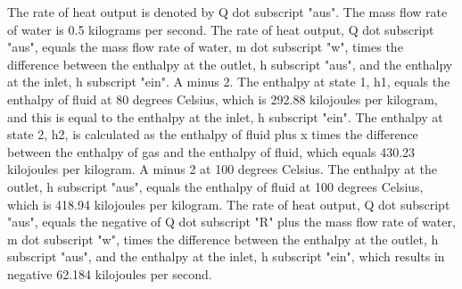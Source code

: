 The rate of heat output is denoted by Q dot subscript "aus".
The mass flow rate of water is 0.5 kilograms per second.
The rate of heat output, Q dot subscript "aus", equals the mass flow rate of water, m dot subscript "w", times the difference between the enthalpy at the outlet, h subscript "aus", and the enthalpy at the inlet, h subscript "ein".
A minus 2.
The enthalpy at state 1, h1, equals the enthalpy of fluid at 80 degrees Celsius, which is 292.88 kilojoules per kilogram, and this is equal to the enthalpy at the inlet, h subscript "ein".
The enthalpy at state 2, h2, is calculated as the enthalpy of fluid plus x times the difference between the enthalpy of gas and the enthalpy of fluid, which equals 430.23 kilojoules per kilogram.
A minus 2 at 100 degrees Celsius.
The enthalpy at the outlet, h subscript "aus", equals the enthalpy of fluid at 100 degrees Celsius, which is 418.94 kilojoules per kilogram.
The rate of heat output, Q dot subscript "aus", equals the negative of Q dot subscript "R" plus the mass flow rate of water, m dot subscript "w", times the difference between the enthalpy at the outlet, h subscript "aus", and the enthalpy at the inlet, h subscript "ein", which results in negative 62.184 kilojoules per second.